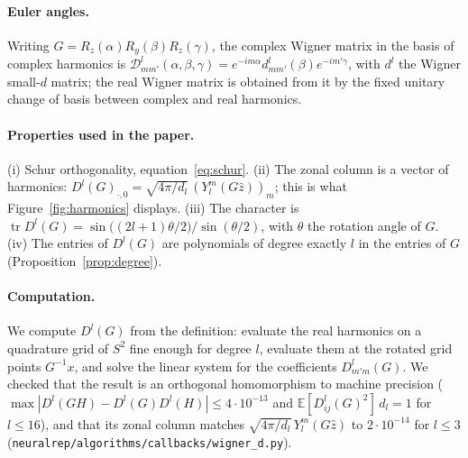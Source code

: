 \documentclass[a4paper,11pt]{article}
\theoremstyle{remark}
\theoremstyle{definition}
\newcommand{\E}{\mathbb{E}}
\newcommand{\tr}{\operatorname{tr}}
\begin{document}
\paragraph{Euler angles.} Writing $G=R_z(\alpha)R_y(\beta)R_z(\gamma)$, the complex
Wigner matrix in the basis of complex harmonics is
$\mathcal D^l_{mm'}(\alpha,\beta,\gamma)=e^{-im\alpha}d^l_{mm'}(\beta)e^{-im'\gamma}$,
with $d^l$ the Wigner small-$d$ matrix; the real Wigner matrix is obtained from it by
the fixed unitary change of basis between complex and real harmonics.

\paragraph{Properties used in the paper.} (i) Schur orthogonality,
equation~\eqref{eq:schur}. (ii) The zonal column is a vector of harmonics:
$D^l(G)_{\cdot,0}=\sqrt{4\pi/d_l}\,(Y_l^m(G\hat z))_m$; this is what
Figure~\ref{fig:harmonics} displays. (iii) The character is
$\tr D^l(G)=\sin\bigl((2l+1)\theta/2\bigr)/\sin(\theta/2)$, with $\theta$ the rotation
angle of $G$. (iv) The entries of $D^l(G)$ are polynomials of degree exactly $l$ in
the entries of $G$ (Proposition~\ref{prop:degree}).

\paragraph{Computation.} We compute $D^l(G)$ from the definition: evaluate the real
harmonics on a quadrature grid of $S^2$ fine enough for degree $l$, evaluate them at
the rotated grid points $G^{-1}x$, and solve the linear system for the coefficients
$D^l_{m'm}(G)$. We checked that the result is an orthogonal homomorphism to
machine precision ($\max|D^l(GH)-D^l(G)D^l(H)|\le4\cdot10^{-13}$ and
$\E[D^l_{ij}(G)^2]\,d_l=1$ for $l\le16$), and that its zonal column matches
$\sqrt{4\pi/d_l}\,Y_l^m(G\hat z)$ to $2\cdot10^{-14}$ for $l\le3$
(\texttt{neuralrep/algorithms/callbacks/wigner\_d.py}).
\end{document}
